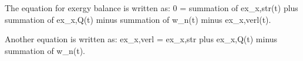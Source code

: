 The equation for exergy balance is written as:  
0 = summation of ex_x,str(t) plus summation of ex_x,Q(t) minus summation of w_n(t) minus ex_x,verl(t).  

Another equation is written as:  
ex_x,verl = ex_x,str plus ex_x,Q(t) minus summation of w_n(t).